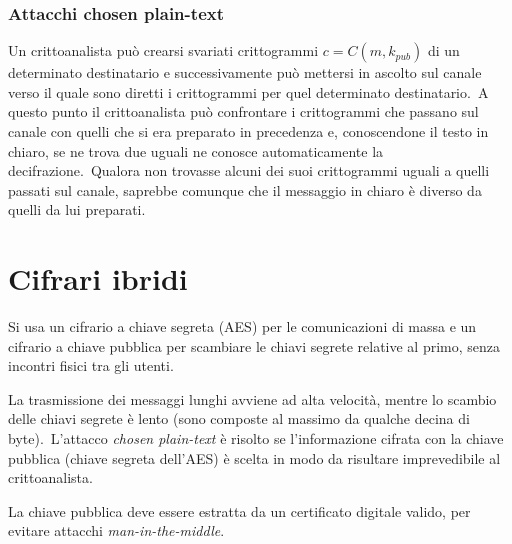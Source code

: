 \subsubsection{Attacchi chosen plain-text}

Un crittoanalista può crearsi svariati crittogrammi $c = C(m, k_{\mathit{pub}})$ di un determinato destinatario e successivamente può mettersi in ascolto sul canale verso il quale sono diretti i crittogrammi per quel determinato destinatario.\
A questo punto il crittoanalista può confrontare i crittogrammi che passano sul canale con quelli che si era preparato in precedenza e, conoscendone il testo in chiaro, se ne trova due uguali ne conosce automaticamente la decifrazione.\
Qualora non trovasse alcuni dei suoi crittogrammi uguali a quelli passati sul canale, saprebbe comunque che il messaggio in chiaro è diverso da quelli da lui preparati.

\section{Cifrari ibridi}

Si usa un cifrario a chiave segreta (AES) per le comunicazioni di massa e un cifrario a chiave pubblica per scambiare le chiavi segrete relative al primo, senza incontri fisici tra gli utenti.\

La trasmissione dei messaggi lunghi avviene ad alta velocità, mentre lo scambio delle chiavi segrete è lento (sono composte al massimo da qualche decina di byte).\
L'attacco \textit{chosen plain-text} è risolto se l'informazione cifrata con la chiave pubblica (chiave segreta dell'AES) è scelta in modo da risultare imprevedibile al crittoanalista.\

La chiave pubblica deve essere estratta da un certificato digitale valido, per evitare attacchi \textit{man-in-the-middle}.\
